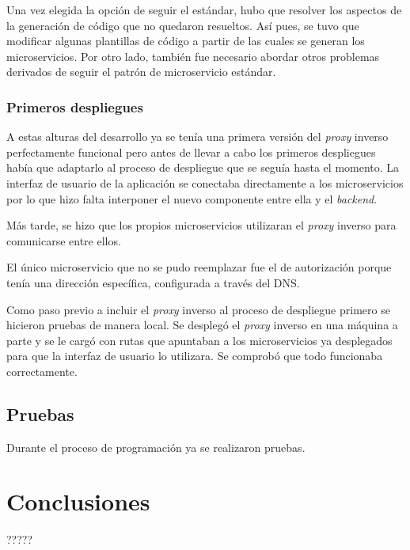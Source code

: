 \documentclass[11pt,spanish,listoffigures]{tfgetsinf}
\begin{document}
Una vez elegida la opción de seguir el estándar, hubo que resolver los aspectos de la generación de código que no quedaron resueltos. Así pues, se tuvo que modificar algunas plantillas de código a partir de las cuales se generan los microservicios. Por otro lado, también fue necesario abordar otros problemas derivados de seguir el patrón de microservicio estándar.

\subsection{Primeros despliegues}

A estas alturas del desarrollo ya se tenía una primera versión del \emph{proxy} inverso perfectamente funcional pero antes de llevar a cabo los primeros despliegues había que adaptarlo al proceso de despliegue que se seguía hasta el momento. La interfaz de usuario de la aplicación se conectaba directamente a los microservicios por lo que hizo falta interponer el nuevo componente entre ella y el \emph{backend}.

Más tarde, se hizo que los propios microservicios utilizaran el \emph{proxy} inverso para comunicarse entre ellos.

El único microservicio que no se pudo reemplazar fue el de autorización porque tenía una dirección específica, configurada a través del DNS.

Como paso previo a incluir el \emph{proxy} inverso al proceso de despliegue primero se hicieron pruebas de manera local. Se desplegó el \emph{proxy} inverso en una máquina a parte y se le cargó con rutas que apuntaban a los microservicios ya desplegados para que la interfaz de usuario lo utilizara. Se comprobó que todo funcionaba correctamente.


\section{Pruebas}

Durante el proceso de programación ya se realizaron pruebas.


\chapter{Conclusiones}

?????
\end{document}
